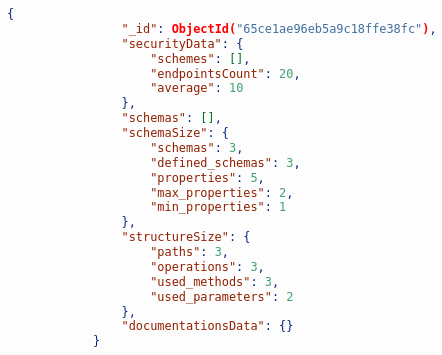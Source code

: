 \begin{lstlisting}[label={lst:data-metrics},language=json,caption={Structure of the specification's metrics data},captionpos=b]
            {
                "_id": ObjectId("65ce1ae96eb5a9c18ffe38fc"),
                "securityData": {
                    "schemes": [],
                    "endpointsCount": 20,
                    "average": 10
                },
                "schemas": [],
                "schemaSize": {
                    "schemas": 3,
                    "defined_schemas": 3,
                    "properties": 5,
                    "max_properties": 2,
                    "min_properties": 1
                },
                "structureSize": {
                    "paths": 3,
                    "operations": 3,
                    "used_methods": 3,
                    "used_parameters": 2
                },
                "documentationsData": {}
            }
\end{lstlisting}

